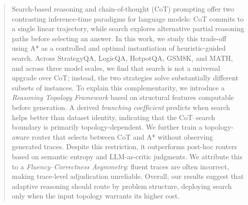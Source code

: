 \documentclass{article}
\begin{document}



\begin{abstract}
Search-based reasoning and chain-of-thought (CoT) prompting offer two contrasting inference-time paradigms for language models: CoT commits to a single linear trajectory, while search explores alternative partial reasoning paths before selecting an answer. In this work, we study this trade-off using A* as a controlled and optimal instantiation of heuristic-guided search. Across StrategyQA, LogicQA, HotpotQA, GSM8K, and MATH, and across three model scales, we find that search is not a universal upgrade over CoT; instead, the two strategies solve substantially different subsets of instances. To explain this complementarity, we introduce a \emph{Reasoning Topology Framework} based on structural features computable before generation. A derived \emph{branching coefficient} predicts when search helps better than dataset identity, indicating that the CoT--search boundary is primarily topology-dependent. We further train a topology-aware router that selects between CoT and A* without observing generated traces. Despite this restriction, it outperforms post-hoc routers based on semantic entropy and LLM-as-critic judgments. We attribute this to a \emph{Fluency--Correctness Asymmetry}: fluent traces are often incorrect, making trace-level adjudication unreliable. Overall, our results suggest that adaptive reasoning should route by problem structure, deploying search only when the input topology warrants its higher cost.
\end{abstract}
\end{document}
